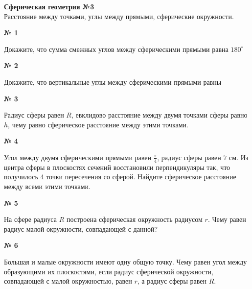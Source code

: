 


    \begin{center}
        \textbf{Сферическая геометрия №3}\\
        Расстояние между точками, углы между прямыми, сферические окружности.
    \end{center}

    \begin{center}
        \textbf{№ 1}
    \end{center}

    Докажите, что сумма смежных углов между сферическими прямыми равна $180^\circ$

    \begin{center}
        \textbf{№ 2}
    \end{center}

    Докажите, что вертикальные углы между сферическими прямыми равны

    \begin{center}
        \textbf{№ 3}
    \end{center}

    Радиус сферы равен $R$, евклидово расстояние между двумя точками сферы равно $h$,
    чему равно сферическое расстояние между этими точками.

    \begin{center}
        \textbf{№ 4}
    \end{center}

    Угол между двумя сферическими прямыми равен $\frac{\pi}{4}$, радиус сферы равен $7$ см.
    Из центра сферы в плоскостях сечений восстановили перпендикуляры так, что получилось 4 точки пересечения со сферой.
    Найдите сферическое расстояние между всеми этими точками.

    \begin{center}
        \textbf{№ 5}
    \end{center}

    На сфере радиуса $R$ построена сферическая окружность радиусом $r$.
    Чему равен радиус малой окружности, совпадающей с данной?

    \begin{center}
        \textbf{№ 6}
    \end{center}

    Большая и малые окружности имеют одну общую точку.
    Чему равен угол между образующими их плоскостями, если радиус сферической окружности,
    совпадающей с малой окружностью, равен $r$, а радиус сферы равен $R$.

